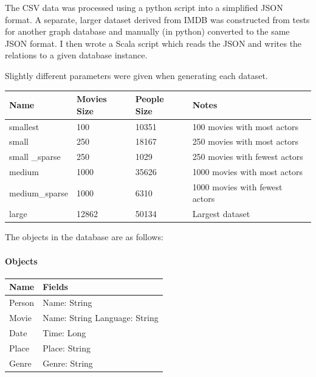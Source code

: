 \documentclass[12pt,a4paper,twoside,openright]{report}
\begin{document}
The CSV data was processed using a python script into a simplified JSON format. A separate, larger dataset derived from IMDB was constructed from tests for another graph database \cite{IMDB} and manually (in python) converted to the same JSON format. I then wrote a Scala script which reads the JSON and writes the relations to a given database instance.

Slightly different parameters were given when generating each dataset.

\begin{center}
	\begin{tabular}{ |p{3cm}||p{3cm}|p{3cm}||p{3cm}|  }	
	\hline
        Name & Movies Size & People Size & Notes \\ \hline
        smallest & 100 & 10351 & 100 movies with most actors \\ \hline
        small & 250 & 18167 & 250 movies with most actors \\ \hline
        small _sparse & 250 & 1029 & 250 movies with fewest actors \\ \hline
        medium & 1000 & 35626 & 1000 movies with most actors \\ \hline
        medium_sparse & 1000 & 6310 & 1000 movies with fewest actors \\ \hline 
       large & 12862 & 50134 & Largest dataset \\ \hline
	\end{tabular}
\end{center}

The objects in the database are as follows:
\paragraph{Objects}
\begin{center}
	\begin{tabular}{ |p{3cm}| p{3cm}|}
	\hline
	Name & Fields \\ \hline
	Person & Name: String \\ \hline
	Movie & Name: String Language: String \\ \hline
	Date & Time: Long \\ \hline
	Place & Place: String \\ \hline
	Genre &	Genre: String \\ \hline
	\end{tabular}
\end{center}
\end{document}
